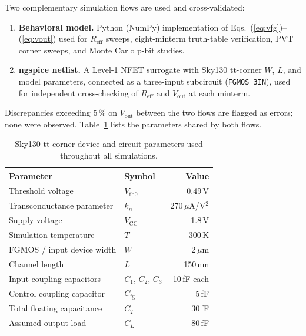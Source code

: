 \documentclass[a4paper,fleqn]{cas-sc}
\newcommand{\Vout}{V_{\mathrm{out}}}
\newcommand{\Vcc}{V_{\mathrm{CC}}}
\newcommand{\Reff}{R_{\mathrm{eff}}}
\newcommand{\Vth}{V_{\mathrm{th0}}}
\newcommand{\kn}{k_{n}}
\newcommand{\CL}{C_{L}}
\newcommand{\CT}{C_{T}}
\begin{document}
Two complementary simulation flows are used and cross-validated:
\begin{enumerate}
  \item \textbf{Behavioral model.} Python (NumPy) implementation of
        Eqs.~(\ref{eq:vfg})--(\ref{eq:vout}) used for $\Reff$ sweeps, eight-minterm
        truth-table verification, PVT corner sweeps, and Monte Carlo p-bit studies.
  \item \textbf{ngspice netlist.} A Level-1 NFET surrogate with Sky130 tt-corner
        $W$, $L$, and model parameters, connected as a three-input subcircuit
        (\texttt{FGMOS\_3IN}), used for independent cross-checking of $\Reff$ and
        $\Vout$ at each minterm.
\end{enumerate}
Discrepancies exceeding 5\,\% on $\Vout$ between the two flows are flagged as errors;
none were observed. Table~\ref{tbl:params} lists the parameters shared by both flows.

\begin{table}[htb]
\centering
\caption{Sky130 tt-corner device and circuit parameters used throughout all simulations.}
\label{tbl:params}
\begin{tabular}{@{}llr@{}}
\toprule
Parameter                  & Symbol                    & Value              \\
\midrule
Threshold voltage          & $\Vth$                    & 0.49\,V            \\
Transconductance parameter & $\kn$                     & 270\,$\mu$A/V$^2$  \\
Supply voltage             & $\Vcc$                    & 1.8\,V             \\
Simulation temperature     & $T$                       & 300\,K             \\
FGMOS / input device width & $W$                       & 2\,$\mu$m          \\
Channel length             & $L$                       & 150\,nm            \\
Input coupling capacitors  & $C_1$, $C_2$, $C_3$       & 10\,fF each        \\
Control coupling capacitor & $C_{\mathrm{fg}}$         & 5\,fF              \\
Total floating capacitance & $\CT$                     & 30\,fF             \\
Assumed output load        & $\CL$                     & 80\,fF             \\
\bottomrule
\end{tabular}
\end{table}
\end{document}
